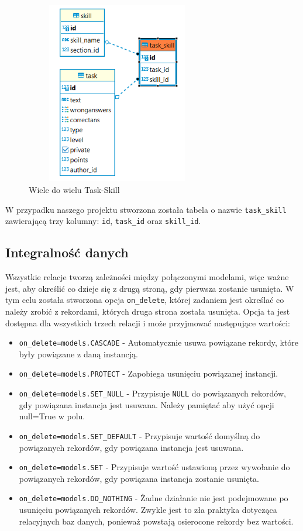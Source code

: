 \documentclass[oneside,polski,logo,indent]{amuthesis}
\begin{document}
\begin{figure}[H]
  \centering
  \includegraphics[width=8cm, height=8cm]{task_skill.png}
  \caption{Wiele do wielu Task-Skill}
  \label{obraz-przyklad}
\end{figure}

W przypadku naszego projektu stworzona została tabela o nazwie \texttt{task\_skill} zawierającą trzy kolumny: \texttt{id}, \texttt{task\_id} oraz \texttt{skill\_id}.

\begin{center}
\subsection{Integralność danych}
\end{center}
Wszystkie relacje tworzą zależności między połączonymi modelami, więc ważne jest, aby określić co dzieje się z drugą stroną, gdy pierwsza zostanie usunięta.
W tym celu została stworzona opcja \texttt{on\_delete}, której zadaniem jest określać co należy zrobić z rekordami, których druga strona została usunięta. Opcja ta jest dostępna dla wszystkich trzech relacji i może przyjmować następujące wartości:
\begin{itemize}
\item \texttt{on\_delete=models.CASCADE} - Automatycznie usuwa powiązane rekordy, które były powiązane z daną instancją.
\item \texttt{on\_delete=models.PROTECT} - Zapobiega usunięciu powiązanej instancji.
\item \texttt{on\_delete=models.SET\_NULL} - Przypisuje \texttt{NULL} do powiązanych rekordów, gdy powiązana instancja jest usuwana. Należy pamiętać aby użyć opcji null=True w polu.
\item \texttt{on\_delete=models.SET\_DEFAULT} - Przypisuje wartość domyślną do powiązanych rekordów, gdy powiązana instancja jest usuwana.
\item \texttt{on\_delete=models.SET} - Przypisuje wartość ustawioną przez wywołanie do powiązanych rekordów, gdy powiązana instancja zostanie usunięta.
\item \texttt{on\_delete=models.DO\_NOTHING} - Żadne działanie nie jest podejmowane po usunięciu powiązanych rekordów. Zwykle jest to zła praktyka dotycząca relacyjnych baz danych, ponieważ powstają osierocone rekordy bez wartości.
\end{itemize}
\end{document}
